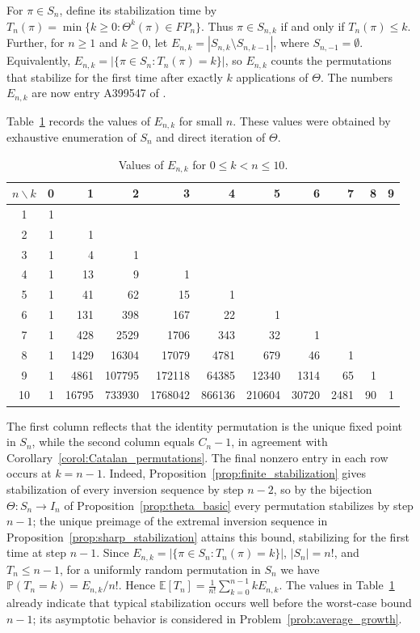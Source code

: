 \documentclass[11pt]{article}
\theoremstyle{remark}
\theoremstyle{definition}
\begin{document}
For $\pi\in S_n$, define its stabilization time by $T_n(\pi)=\min\{k\geq0:\Theta^k(\pi)\in FP_n\}$. Thus $\pi\in S_{n,k}$ if and only if $T_n(\pi)\leq k$. Further, for $n\geq1$ and $k\geq0$, let $E_{n,k}=|S_{n,k}\setminus S_{n,k-1}|$, where $S_{n,-1}=\emptyset$. Equivalently, $E_{n,k}=|\{\pi\in S_n:T_n(\pi)=k\}|$, so $E_{n,k}$ counts the permutations that stabilize for the first time after exactly $k$ applications of $\Theta$. The numbers $E_{n,k}$ are now entry A399547 of \cite{OEIS}.

Table~\ref{tabl:stabilization_time} records the values of $E_{n,k}$ for
small $n$. These values were obtained by exhaustive enumeration of $S_n$
and direct iteration of $\Theta$.

\begin{table}[ht]
\begin{center}
\small
\begin{tabular}{c|rrrrrrrrrr}
$n\backslash k$ & 0 & 1 & 2 & 3 & 4 & 5 & 6 & 7 & 8 & 9 \\
\hline
1 & 1 \\
2 & 1 & 1 \\
3 & 1 & 4 & 1 \\
4 & 1 & 13 & 9 & 1 \\
5 & 1 & 41 & 62 & 15 & 1 \\
6 & 1 & 131 & 398 & 167 & 22 & 1 \\
7 & 1 & 428 & 2529 & 1706 & 343 & 32 & 1 \\
8 & 1 & 1429 & 16304 & 17079 & 4781 & 679 & 46 & 1 \\
9 & 1 & 4861 & 107795 & 172118 & 64385 & 12340 & 1314 & 65 & 1 \\
10 & 1 & 16795 & 733930 & 1768042 & 866136 & 210604 & 30720 & 2481 & 90 & 1
\end{tabular}
\end{center}
\caption{Values of $E_{n,k}$ for $0\leq k<n\leq10$.}
\label{tabl:stabilization_time}
\end{table}

The first column reflects that the identity permutation is the unique
fixed point in $S_n$, while the second column equals $C_n-1$, in
agreement with Corollary~\ref{corol:Catalan_permutations}. The final
nonzero entry in each row occurs at $k=n-1$. Indeed,
Proposition~\ref{prop:finite_stabilization} gives stabilization of every
inversion sequence by step $n-2$, so by the bijection
$\Theta:S_n\to I_n$ of Proposition~\ref{prop:theta_basic} every
permutation stabilizes by step $n-1$; the unique preimage of the extremal
inversion sequence in Proposition~\ref{prop:sharp_stabilization} attains
this bound, stabilizing for the first time at step $n-1$. Since
$E_{n,k}=|\{\pi\in S_n:T_n(\pi)=k\}|$, $|S_n|=n!$, and $T_n\leq n-1$, for a
uniformly random permutation in $S_n$ we have
$\mathbb{P}(T_n=k)=E_{n,k}/n!$. Hence
$\mathbb{E}[T_n]=\frac{1}{n!}\sum_{k=0}^{n-1}kE_{n,k}$. The values in
Table~\ref{tabl:stabilization_time} already indicate that typical
stabilization occurs well before the worst-case bound $n-1$; its
asymptotic behavior is considered in Problem~\ref{prob:average_growth}.
\end{document}
